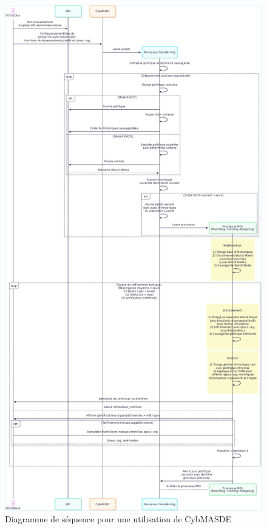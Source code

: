 \begin{figure}[H]
  \includegraphics[trim={0cm 0cm 0cm 0cm},clip,height=\textheight]{figures/diagramme_sequence_CybMASDE.pdf}
  \caption{Diagramme de séquence pour une utilisation de CybMASDE}
  \label{fig:cybmasde_sequence}
\end{figure}

